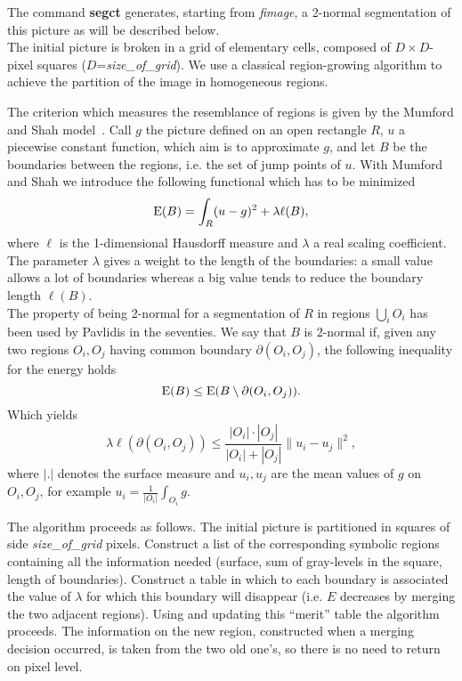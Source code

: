 \def\Disp#1{{\displaystyle #1}}
\def\Dfrac#1#2{{\displaystyle \frac{#1}{#2}}}


The command {\bf segct} generates, starting from {\em fimage}, 
a 2-normal segmentation
of this picture as will be described below.\\
The initial picture is broken in a grid of elementary cells, composed of
$D\times D$-pixel squares ($D$={\em size\_of\_grid}). 
We use a classical region-growing algorithm to achieve the partition of the 
image in homogeneous regions.

The criterion which measures the resemblance of regions is given by the 
Mumford and Shah model~\cite{morel.solimini:variational}. 
Call $g$ the picture defined on an open rectangle $R$,
$u$ a piecewise constant function, which aim is to approximate $g$, and
let $B$ be the boundaries between the regions, i.e. the set of jump points of
$u$. With Mumford and Shah we introduce the following functional which has
to be minimized
$$ {\rm E}(B)=\int_{R} (u-g)^{2} + \lambda\ell(B),$$
where $\ell$ is the 1-dimensional Hausdorff measure and $\lambda$ a real
scaling coefficient. The parameter $\lambda$ gives a weight to the length
of the boundaries: a small value allows a lot of boundaries whereas a big
value tends to reduce the boundary length $\ell(B)$.\\
The property of being 2-normal for a segmentation of $R$ in regions
$\Disp{\bigcup_{i} O_{i}}$ has been used by Pavlidis in the seventies. 
We say that $B$ is 2-normal if, given any two regions $O_{i},O_{j}$ having
common boundary $\partial(O_{i},O_{j})$, the following inequality for
the energy holds 
$$ {\rm E}(B) \leq {\rm E}(B\setminus\partial(O_{i},O_{j})). $$
Which yields
$$ \lambda\ell(\partial(O_{i},O_{j}))\leq\frac{|O_{i}|\cdot |O_{j}|}{|O_{i}|+|O_{j}|}\| u_{i}-u_{j}\| ^{2},$$
where $|.|$ denotes the surface measure and $u_{i},u_{j}$ are the mean values
of $g$ on $O_{i},O_{j}$, for example 
$u_{i}=\Dfrac{1}{|O_{i}|}\Disp{\int_{O_{i}}}g$.

The algorithm proceeds as follows. 
The initial picture is partitioned in squares of side {\em size\_of\_grid}
pixels. 
Construct a list of the corresponding 
symbolic regions containing all the information needed (surface, sum 
of gray-levels in the square, length of boundaries).
Construct a table in which to each boundary is associated the 
value of $\lambda$ for which this boundary will disappear (i.e.
 $E$ decreases by merging the two adjacent regions).
Using and updating this ``merit'' table the algorithm proceeds.
The information on the new region, constructed when a merging decision occurred,
 is taken
from the two old one's, so there is no need to return on pixel level.

